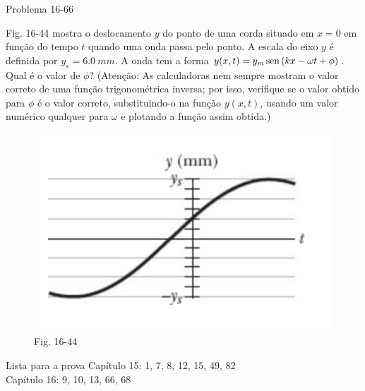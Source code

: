\begin{frame}{Problema 16-66}
    \begin{minipage}{\textwidth}
        Fig. 16-44 mostra o deslocamento \(y\) do ponto de uma corda situado em \(x = 0\) 
        em função do tempo \(t\) quando uma onda passa pelo ponto. A escala do eixo \(y\)
        é definida por \(y_s = \SI{6,0}{mm}\). A onda tem a forma \(y(x, t) = y_m \operatorname{sen}{(kx - \omega t + \phi)}\).
        Qual é o valor de \(\phi\)? 
        (Atenção: As calculadoras nem sempre mostram o valor correto de uma função trigonométrica inversa; 
        por isso, verifique se o valor obtido para \(\phi\) é o valor correto, substituindo-o na função
        \(y(x, t)\), usando um valor numérico qualquer para \(\omega\) e plotando a função assim obtida.)
    \end{minipage}

    \centering
    \begin{figure}
        \includegraphics[height=0.38\textheight]{images/Captura de tela de 2023-02-02 10-49-34.png}
        \caption{Fig. 16-44}
    \end{figure}
\end{frame}

\begin{frame}{Lista para a prova}
    Capítulo 15: 1, 7, 8, 12, 15, 49, 82 \\
    Capítulo 16: 9, 10, 13, 66, 68
\end{frame}

